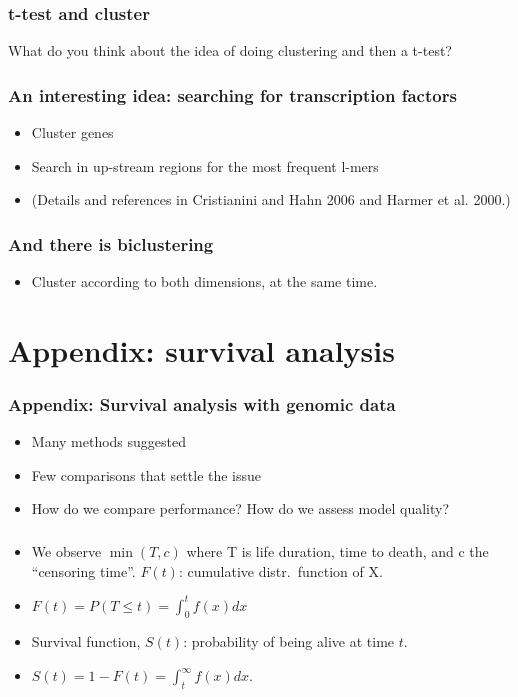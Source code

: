 \begin{frame}
\frametitle{t-test and cluster}
What do you think about the idea of doing clustering and then a t-test?
\end{frame}


\begin{frame}
\frametitle{An interesting idea: searching for transcription factors}
\begin{itemize}
\item Cluster genes
\item Search in up-stream regions for the most frequent l-mers

\item (Details and references in Cristianini and Hahn 2006 and Harmer et
  al. 2000.)
\end{itemize}
\end{frame}


\begin{frame}
  \frametitle{And there is biclustering}
  \begin{itemize}
  \item Cluster according to both dimensions, at the same time.
  \end{itemize}
\end{frame}




\section{Appendix: survival analysis}
\begin{frame}[label=Survival]
\frametitle{Appendix: Survival analysis with genomic data}
\begin{itemize}
\item Many methods suggested
\item Few comparisons that settle the issue
\item How do we compare performance? How do we assess model quality?
\end{itemize}
\end{frame}



\begin{frame}
\frametitle{}
\begin{itemize}
\item We observe $\min (T, c)$ where T is life duration, time to death, and
  c the ``censoring time''. $F(t)$: cumulative distr.\
  function of X.
\item $F(t) = P(T \le t) = \int_0^t f(x) dx$
\item Survival function, $S(t)$:
  probability of being alive at time $t$. 
\item $S(t) = 1 - F(t) = \int_t^{\infty} f(x) dx$.
\end{itemize}
\end{frame}

